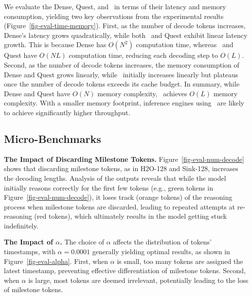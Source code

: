 We evaluate the Dense, Quest, and \algo\ in terms of their latency and memory consumption, yielding two key observations from the experimental results (Figure~\ref{fig-eval-time-memory}). First, as the number of decode tokens increases, Dense's latency grows quadratically, while both \algo\ and Quest exhibit linear latency growth. This is because Dense has $O(N^2)$ computation time, whereas \algo\ and Quest have $O(NL)$ computation time, reducing each decoding step to $O(L)$. Second, as the number of decode tokens increases, the memory consumption of Dense and Quest grows linearly, while \algo\ initially increases linearly but plateaus once the number of decode tokens exceeds its cache budget. In summary, while Dense and Quest have $O(N)$ memory complexity, \algo\ achieves $O(L)$ memory complexity. With a smaller memory footprint, inference engines using \algo\ are likely to achieve significantly higher throughput.



\subsection{Micro-Benchmarks}


\textbf{The Impact of Discarding Milestone Tokens.} Figure~\ref{fig-eval-num-decode} shows that discarding milestone tokens, as in H2O-128 and Sink-128, increases the decoding lengths. Analysis of the outputs reveals that while the model initially reasons correctly for the first few tokens (e.g., green tokens in Figure~\ref{fig-eval-num-decode}), it loses track (orange tokens) of the reasoning process when milestone tokens are discarded, leading to repeated attempts at re-reasoning (red tokens), which ultimately results in the model getting stuck indefinitely.



\textbf{The Impact of $\alpha$.} The choice of $\alpha$ affects the distribution of tokens' timestamps, with $\alpha = 0.0001$ generally yielding optimal results, as shown in Figure~\ref{fig-eval-alpha}. First, when $\alpha$ is small, too many tokens are assigned the latest timestamp, preventing effective differentiation of milestone tokens. Second, when $\alpha$ is large, most tokens are deemed irrelevant, potentially leading to the loss of milestone tokens.








